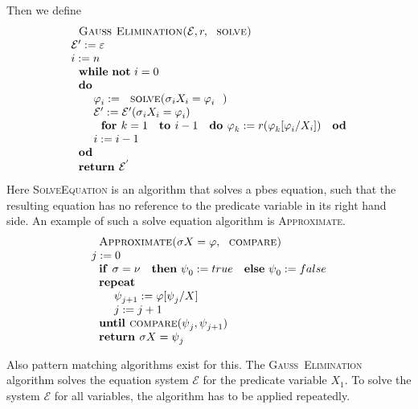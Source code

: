 \documentclass{article}
\begin{document}
Then we define%
\begin{equation*}
\begin{array}{l}
\text{\textsc{Gau\textsc{\ss\ }Elimination(}}\mathcal{E},r,\text{\textsc{%
solve)}} \\ 
\mathcal{E}^{\prime }:=\varepsilon \\ 
i:=n \\ 
\text{\textbf{while} \textbf{not} }i=0 \\ 
\text{\textbf{do}} \\ 
\qquad \varphi _{i}:=\text{\textsc{solve(}}\sigma _{i}X_{i}=\varphi _{i}%
\text{\textsc{)}} \\ 
\qquad \mathcal{E}^{\prime }:=\mathcal{E}^{\prime }(\sigma _{i}X_{i}=\varphi
_{i}) \\ 
\qquad \text{\textbf{for }}k=1\text{ \textbf{to }}i-1\text{ \textbf{do }}%
\varphi _{k}:=r(\varphi _{k}[\varphi _{i}/X_{i}])\text{ \textbf{od}} \\ 
\qquad i:=i-1 \\ 
\text{\textbf{od}} \\ 
\text{\textbf{return }}\mathcal{E}^{^{\prime }}%
\end{array}%
\end{equation*}%
Here \textsc{SolveEquation} is an algorithm that solves a pbes equation,
such that the resulting equation has no reference to the predicate variable
in its right hand side. An example of such a solve equation algorithm is 
\textsc{Approximate}.%
\begin{equation*}
\begin{array}{l}
\text{\textsc{Approximate(}}\sigma X=\varphi ,\text{\textsc{compare)}} \\ 
j:=0 \\ 
\text{\textbf{if }}\sigma =\nu \text{ \textbf{then} }\psi _{0}:=true\text{ 
\textbf{else} }\psi _{0}:=false \\ 
\text{\textbf{repeat}} \\ 
\qquad \psi _{j+1}:=\varphi \lbrack \psi _{j}/X] \\ 
\qquad j:=j+1 \\ 
\text{\textbf{until }\textsc{compare}}(\psi _{j},\psi _{j+1}) \\ 
\text{\textbf{return }}\sigma X=\psi _{j}%
\end{array}%
\end{equation*}

Also pattern matching algorithms exist for this. The \textsc{Gau\textsc{\ss\ 
}Elimination} algorithm solves the equation system $\mathcal{E}$ for the
predicate variable $X_{1}$. To solve the system $\mathcal{E}$ for all
variables, the algorithm has to be applied repeatedly.
\end{document}
